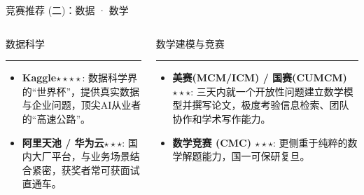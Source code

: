 \documentclass{beamer}
\begin{document}
\begin{frame}{竞赛推荐 (二)：数据 · 数学}
    \begin{columns}[T]
        \begin{column}{0.5\textwidth}
            \begin{center}
                \huge 数据科学
                \rule{0.8\linewidth}{0.4pt}
            \end{center}
            \begin{itemize}
                 \item \textbf{Kaggle$\star \star \star \star$}: \small 数据科学界的“世界杯”，提供真实数据与企业问题，顶尖AI从业者的“高速公路”。
                 \item \textbf{阿里天池 / 华为云$\star \star \star$}: \small 国内大厂平台，与业务场景结合紧密，获奖者常可获面试直通车。
            \end{itemize}
        \end{column}
        
        \begin{column}{0.5\textwidth}
            \begin{center}
                \huge 数学建模与竞赛
                \rule{0.8\linewidth}{0.4pt}
            \end{center}
            \begin{itemize}
                \item \textbf{美赛(MCM/ICM) / 国赛(CUMCM) $\star \star \star$}: \small 三天内就一个开放性问题建立数学模型并撰写论文，极度考验\alert{信息检索、团队协作和学术写作}能力。
                \item \textbf{数学竞赛 (CMC) $\star \star \star $}: \small 更侧重于纯粹的数学解题能力，国一可保研复旦。
            \end{itemize}
        \end{column}
    \end{columns}
\end{frame}
\end{document}
